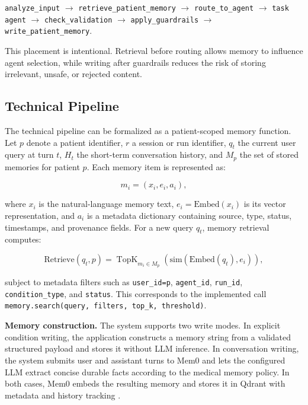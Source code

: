 \begin{center}
\texttt{analyze\_input} $\rightarrow$ \texttt{retrieve\_patient\_memory} $\rightarrow$ \texttt{route\_to\_agent} $\rightarrow$ \texttt{task agent} $\rightarrow$ \texttt{check\_validation} $\rightarrow$ \texttt{apply\_guardrails} $\rightarrow$ \texttt{write\_patient\_memory}.
\end{center}

This placement is intentional. Retrieval before routing allows memory to influence agent selection, while writing after guardrails reduces the risk of storing irrelevant, unsafe, or rejected content.

\subsection{Technical Pipeline}

The technical pipeline can be formalized as a patient-scoped memory function. Let $p$ denote a patient identifier, $r$ a session or run identifier, $q_t$ the current user query at turn $t$, $H_t$ the short-term conversation history, and $M_p$ the set of stored memories for patient $p$. Each memory item is represented as:

\[
m_i = (x_i, e_i, a_i),
\]

where $x_i$ is the natural-language memory text, $e_i = \mathrm{Embed}(x_i)$ is its vector representation, and $a_i$ is a metadata dictionary containing source, type, status, timestamps, and provenance fields. For a new query $q_t$, memory retrieval computes:

\[
\mathrm{Retrieve}(q_t, p) =
\operatorname{TopK}_{m_i \in M_p}
\left(\mathrm{sim}(\mathrm{Embed}(q_t), e_i)\right),
\]

subject to metadata filters such as \texttt{user\_id=p}, \texttt{agent\_id}, \texttt{run\_id}, \texttt{condition\_type}, and \texttt{status}. This corresponds to the implemented call \texttt{memory.search(query, filters, top\_k, threshold)}.

\textbf{Memory construction.} The system supports two write modes. In explicit condition writing, the application constructs a memory string from a validated structured payload and stores it without LLM inference. In conversation writing, the system submits user and assistant turns to Mem0 and lets the configured LLM extract concise durable facts according to the medical memory policy. In both cases, Mem0 embeds the resulting memory and stores it in Qdrant with metadata and history tracking \cite{mem0_paper,qdrant_doc}.

